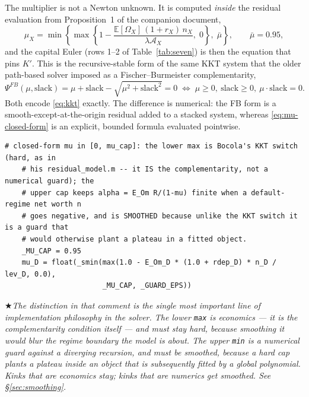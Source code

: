 \documentclass[11pt]{article}
\numberwithin{equation}{section}
\newcommand{\E}{\mathbb{E}}
\newcommand{\code}[1]{\texttt{\small #1}}
\theoremstyle{definition}
\theoremstyle{plain}
\theoremstyle{remark}
\newcommand{\warn}[1]{\par\smallskip\noindent
  \textcolor{red!60!black}{$\bigstar$}\;\emph{#1}\par\smallskip}
\begin{document}
The multiplier is not a Newton unknown. It is computed \emph{inside} the residual
evaluation from Proposition~1 of the companion document,
\begin{equation}
\mu_{X}=\min\left\{\max\left\{1-\frac{\E[\Omega_X]\,(1+r_X)\,n_X}{\lambda\mathcal{A}_X},\;0\right\},\;
\bar\mu\right\},
\qquad \bar\mu=0.95,
\label{eq:mu-closed-form}
\end{equation}
and the capital Euler (rows 1--2 of Table~\ref{tab:seven}) is then the equation that
pins $K'$. This is the recursive-stable form of the same KKT system that the older
path-based solver imposed as a Fischer--Burmeister complementarity,
\begin{equation}
\Psi^{FB}(\mu,\mathrm{slack})=\mu+\mathrm{slack}-\sqrt{\mu^{2}+\mathrm{slack}^{2}}=0
\;\Longleftrightarrow\;
\mu\ge0,\ \mathrm{slack}\ge0,\ \mu\cdot\mathrm{slack}=0 .
\label{eq:FB}
\end{equation}
Both encode \eqref{eq:kkt} exactly. The difference is numerical: the FB form is a
smooth-except-at-the-origin residual added to a stacked system, whereas
\eqref{eq:mu-closed-form} is an explicit, bounded formula evaluated pointwise.

\begin{lstlisting}[caption={The KKT switch (hard) inside a smoothed cap. \code{point\_map.py}.}]
    # closed-form mu in [0, mu_cap]: the lower max is Bocola's KKT switch (hard, as in
    # his residual_model.m -- it IS the complementarity, not a numerical guard); the
    # upper cap keeps alpha = E_Om R/(1-mu) finite when a default-regime net worth n
    # goes negative, and is SMOOTHED because unlike the KKT switch it is a guard that
    # would otherwise plant a plateau in a fitted object.
    _MU_CAP = 0.95
    mu_D = float(_smin(max(1.0 - E_Om_D * (1.0 + rdep_D) * n_D / lev_D, 0.0),
                       _MU_CAP, _GUARD_EPS))
\end{lstlisting}

\warn{The distinction in that comment is the single most important line of
implementation philosophy in the solver. The \emph{lower} \code{max} is economics ---
it is the complementarity condition itself --- and must stay hard, because smoothing
it would blur the regime boundary the model is about. The \emph{upper} \code{min} is
a numerical guard against a diverging recursion, and must be smoothed, because a hard
cap plants a plateau inside an object that is subsequently fitted by a global
polynomial. Kinks that are economics stay; kinks that are numerics get smoothed. See
\S\ref{sec:smoothing}.}
\end{document}
